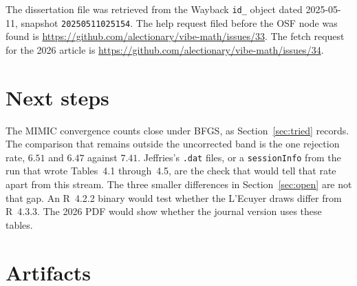 \documentclass[11pt]{article}
\begin{document}
The dissertation file was retrieved from the Wayback \texttt{id\_}
object dated 2025-05-11, snapshot \texttt{20250511025154}.
The help request filed before the OSF node was found is
\url{https://github.com/alectionary/vibe-math/issues/33}.
The fetch request for the 2026 article is
\url{https://github.com/alectionary/vibe-math/issues/34}.

\section{Next steps}

The MIMIC convergence counts close under BFGS, as
Section~\ref{sec:tried} records. The comparison that remains outside
the uncorrected band is the one rejection rate, \(6.51\) and \(6.47\)
against \(7.41\). Jeffries's \texttt{.dat} files, or a
\texttt{sessionInfo} from the run that wrote Tables~4.1 through~4.5,
are the check that would tell that rate apart from this stream.
The three smaller differences in Section~\ref{sec:open} are not that
gap. An R~4.2.2 binary would test whether the L'Ecuyer draws differ
from R~4.3.3. The 2026 PDF would show whether the journal version uses
these tables.

\section{Artifacts}
\label{app:artifacts}
\end{document}
